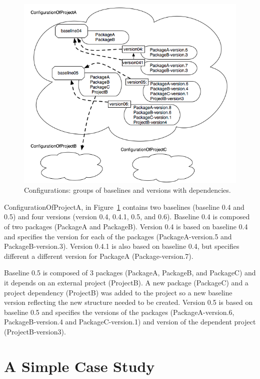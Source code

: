 \documentclass[a4paper,10pt,twoside]{book}
\begin{document}
\begin{figure}
\begin{center}
\includegraphics[width=\linewidth]{configurations}
\caption{Configurations: groups of baselines and versions with dependencies.\label{configurations}}
\end{center}
\end{figure}


ConfigurationOfProjectA, in Figure~\ref{configurations} contains two baselines (baseline 0.4 and 0.5) and four versions (version 0.4, 0.4.1, 0.5, and 0.6). Baseline 0.4 is composed of two packages (PackageA and PackageB). Version 0.4 is based on baseline 0.4 and specifies the version for each of the packages (PackageA-version.5 and PackageB-version.3). Version 0.4.1 is also based on baseline 0.4, but specifies different a different version for PackageA (Package-version.7).

Baseline 0.5 is composed of 3 packages (PackageA, PackageB, and PackageC) and it depends on an external project (ProjectB). A new package (PackageC) and a project dependency (ProjectB) was added to the project so a new baseline version reflecting the new structure needed to be created. Version 0.5 is based on baseline 0.5 and specifies the versions of the packages (PackageA-version.6, PackageB-version.4 and PackageC-version.1) and version of the dependent project (ProjectB-version3).



\section{A Simple Case Study}
\end{document}
